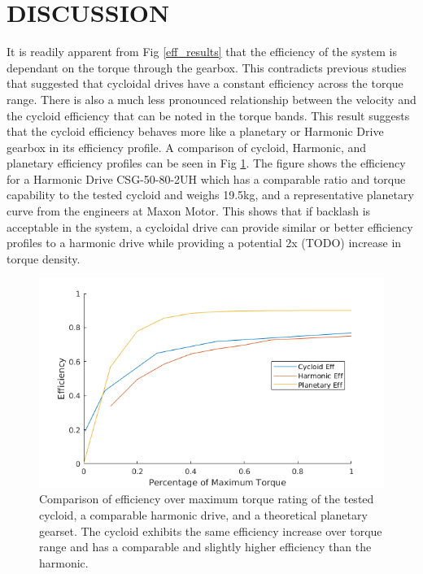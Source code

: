 \documentclass[letterpaper, 10 pt, conference]{ieeeconf}  %
\begin{document}
\section{DISCUSSION} \label{discussion}

It is readily apparent from Fig \ref{eff_results} that the efficiency of the system is dependant on the torque through the gearbox. This contradicts previous studies that suggested that cycloidal drives have a constant efficiency across the torque range. There is also a much less pronounced relationship between the velocity and the cycloid efficiency that can be noted in the torque bands. This result suggests that the cycloid efficiency behaves more like a planetary or Harmonic Drive gearbox in its efficiency profile. A comparison of cycloid, Harmonic, and planetary efficiency profiles can be seen in Fig \ref{eff_comp}. The figure shows the efficiency for a Harmonic Drive CSG-50-80-2UH \cite{harmonic_sheet} which has a comparable ratio and torque capability to the tested cycloid and weighs 19.5kg, and a representative planetary curve from the engineers at Maxon Motor. This shows that if backlash is acceptable in the system, a cycloidal drive can provide similar or better efficiency profiles to a harmonic drive while providing a potential 2x (TODO) increase in torque density.

   \begin{figure}[!b]
      \centering
      \includegraphics[width=\linewidth]{eff_comp_v2}
      \caption{Comparison of efficiency over maximum torque rating of the tested cycloid, a comparable harmonic drive, and a theoretical planetary gearset. The cycloid exhibits the same efficiency increase over torque range and has a comparable and slightly higher efficiency than the harmonic.}
      \label{eff_comp}
   \end{figure}
   
\end{document}
